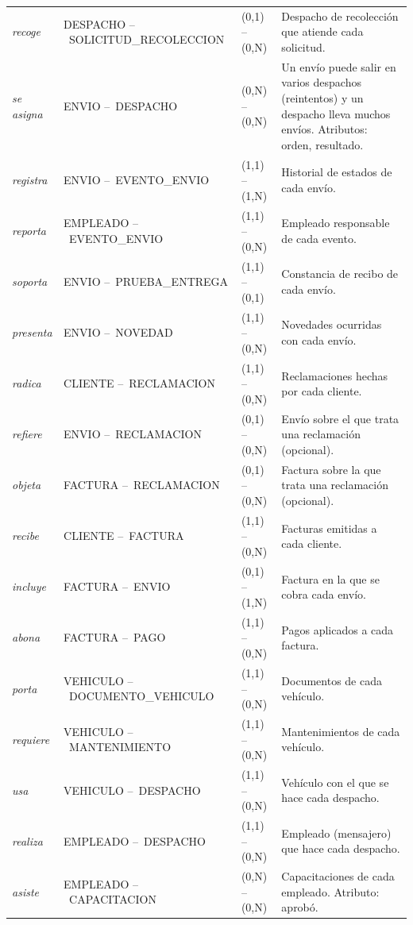 {\begin{longtable}{L{1.5cm} L{5.0cm} L{2.2cm} L{5.4cm}}
\textit{recoge} & DESPACHO --\allowbreak\ SOLICITUD\_RECOLECCION & (0,1) -- (0,N) & Despacho de recolección que atiende cada solicitud. \\
\textit{se asigna} & ENVIO --\allowbreak\ DESPACHO & (0,N) -- (0,N) & Un envío puede salir en varios despachos (reintentos) y un despacho lleva muchos envíos. Atributos: orden, resultado. \\
\textit{registra} & ENVIO --\allowbreak\ EVENTO\_ENVIO & (1,1) -- (1,N) & Historial de estados de cada envío. \\
\textit{reporta} & EMPLEADO --\allowbreak\ EVENTO\_ENVIO & (1,1) -- (0,N) & Empleado responsable de cada evento. \\
\textit{soporta} & ENVIO --\allowbreak\ PRUEBA\_ENTREGA & (1,1) -- (0,1) & Constancia de recibo de cada envío. \\
\textit{presenta} & ENVIO --\allowbreak\ NOVEDAD & (1,1) -- (0,N) & Novedades ocurridas con cada envío. \\
\textit{radica} & CLIENTE --\allowbreak\ RECLAMACION & (1,1) -- (0,N) & Reclamaciones hechas por cada cliente. \\
\textit{refiere} & ENVIO --\allowbreak\ RECLAMACION & (0,1) -- (0,N) & Envío sobre el que trata una reclamación (opcional). \\
\textit{objeta} & FACTURA --\allowbreak\ RECLAMACION & (0,1) -- (0,N) & Factura sobre la que trata una reclamación (opcional). \\
\textit{recibe} & CLIENTE --\allowbreak\ FACTURA & (1,1) -- (0,N) & Facturas emitidas a cada cliente. \\
\textit{incluye} & FACTURA --\allowbreak\ ENVIO & (0,1) -- (1,N) & Factura en la que se cobra cada envío. \\
\textit{abona} & FACTURA --\allowbreak\ PAGO & (1,1) -- (0,N) & Pagos aplicados a cada factura. \\
\textit{porta} & VEHICULO --\allowbreak\ DOCUMENTO\_VEHICULO & (1,1) -- (0,N) & Documentos de cada vehículo. \\
\textit{requiere} & VEHICULO --\allowbreak\ MANTENIMIENTO & (1,1) -- (0,N) & Mantenimientos de cada vehículo. \\
\textit{usa} & VEHICULO --\allowbreak\ DESPACHO & (1,1) -- (0,N) & Vehículo con el que se hace cada despacho. \\
\textit{realiza} & EMPLEADO --\allowbreak\ DESPACHO & (1,1) -- (0,N) & Empleado (mensajero) que hace cada despacho. \\
\textit{asiste} & EMPLEADO --\allowbreak\ CAPACITACION & (0,N) -- (0,N) & Capacitaciones de cada empleado. Atributo: aprobó. \\
\end{longtable}
\par}

